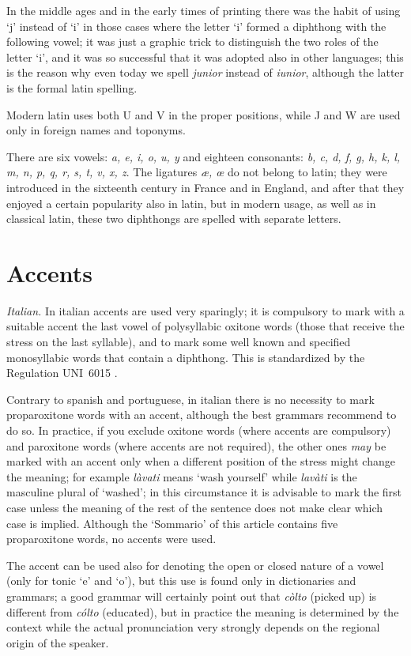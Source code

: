 In the middle ages and in the early times of printing there was the habit of
using `j' instead of `i' in those  cases  where  the  letter  `i'  formed  a
diphthong  with  the  following  vowel;  it  was  just  a  graphic  trick to
distinguish the two roles of the letter `i', and it was so  successful  that
it was adopted also in other languages; this is the reason why even today we
spell {\it junior} instead of {\it  iunior},  although  the  latter  is  the
formal latin spelling.

Modern  latin  uses  both U and V in the proper positions, while J and W are
used only in foreign names and toponyms.

There  are  six vowels: {\it a, e, i, o, u, y} and eighteen consonants: {\it
b, c, d, f, g, h, k, l, m, n, p, q, r, s, t, v, x, z}.  The  ligatures  {\it
\ae,  \oe}  do  not  belong  to latin; they were introduced in the sixteenth
century in France and in England, and after  that  they  enjoyed  a  certain
popularity  also  in  latin,  but  in  modern usage, as well as in classical
latin, these two diphthongs are spelled with separate letters.

\section{Accents}
{\it  Italian.} In italian accents are used very sparingly; it is compulsory
to mark with a suitable accent the last vowel of polysyllabic oxitone  words
(those  that receive the stress on the last syllable), and to mark some well
known and specified monosyllabic words that contain  a  diphthong.  This  is
standardized by the Regulation UNI~6015 \cite{6015}.

Contrary to spanish and portuguese, in italian there is no necessity to mark
proparoxitone words with an accent, although the best grammars recommend  to
do  so.  In  practice,  if  you  exclude  oxitone  words  (where accents are
compulsory) and paroxitone words (where accents are not required), the other
ones  {\it  may}  be marked with an accent only when a different position of
the stress might change the meaning; for example {\it l\`avati} means  `wash
yourself'  while {\it lav\`ati} is the masculine plural of `washed'; in this
circumstance it is advisable to mark the first case  unless the  meaning  of
the rest of the sentence does not make clear which case is implied. Although
the `Sommario' of this article contains five proparoxitone words, no accents
were used.

The  accent  can  be  used  also for denoting the open or closed nature of a
vowel (only for  tonic  `e'  and  `o'),  but  this  use  is  found  only  in
dictionaries and grammars; a good grammar will certainly point out that {\it
c\`olto} (picked up) is different from  {\it  c\'olto}  (educated),  but  in
practice  the  meaning  is  determined  by  the  context  while  the  actual
pronunciation very strongly depends on the regional origin of the speaker.

